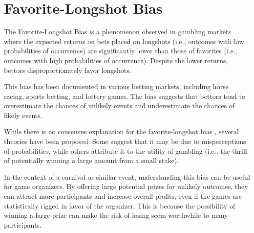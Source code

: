 \section{Favorite-Longshot Bias}
\label{appendix:favorite_longshot}

The Favorite-Longshot Bias is a phenomenon observed in gambling markets where the expected returns on bets placed on longshots (i.e., outcomes with low probabilities of occurrence) are significantly lower than those of favorites (i.e., outcomes with high probabilities of occurrence). Despite the lower returns, bettors disproportionately favor longshots.

This bias has been documented in various betting markets, including horse racing, sports betting, and lottery games. The bias suggests that bettors tend to overestimate the chances of unlikely events and underestimate the chances of likely events.

While there is no consensus explanation for the favorite-longshot bias \cite{ottaviani_2008_chapter}, several theories have been proposed. Some suggest that it may be due to misperceptions of probabilities, while others attribute it to the utility of gambling (i.e., the thrill of potentially winning a large amount from a small stake).

In the context of a carnival or similar event, understanding this bias can be useful for game organizers. By offering large potential prizes for unlikely outcomes, they can attract more participants and increase overall profits, even if the games are statistically rigged in favor of the organizer. This is because the possibility of winning a large prize can make the risk of losing seem worthwhile to many participants.
